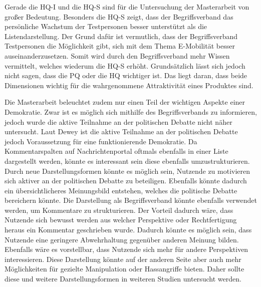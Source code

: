 Gerade die \ac{HQ-I} und die \ac{HQ-S} sind für die Untersuchung der Masterarbeit von großer Bedeutung.
Besonders die \ac{HQ-S} zeigt, dass der Begriffsverband das persönliche Wachstum der Testpersonen besser unterstützt als die Listendarstellung.
Der Grund dafür ist vermutlich, dass der Begriffsverband Testpersonen die Möglichkeit gibt, sich mit dem Thema E-Mobilität besser auseinanderzusetzen.
Somit wird durch den Begriffsverband mehr Wissen vermittelt, welches wiederum die \ac{HQ-S} erhöht.
Grundsätzlich lässt sich jedoch nicht sagen, dass die \ac{PQ} oder die \ac{HQ} wichtiger ist.
Das liegt daran, dass beide Dimensionen wichtig für die wahrgenommene Attraktivität eines Produktes sind.

Die Masterarbeit beleuchtet zudem nur einen Teil der wichtigen Aspekte einer Demokratie.
Zwar ist es möglich sich mithilfe des Begriffsverbands zu informieren, jedoch wurde die aktive Teilnahme an der politischen Debatte nicht näher untersucht.
Laut Dewey ist die aktive Teilnahme an der politischen Debatte jedoch Voraussetzung für eine funktionierende Demokratie.
Da Kommentarspalten auf Nachrichtenportal oftmals ebenfalls in einer Liste dargestellt werden, könnte es interessant sein diese ebenfalls umzustrukturieren.
Durch neue Darstellungsformen könnte es möglich sein, Nutzende zu motivieren sich aktiver an der politischen Debatte zu beteiligen.
Ebenfalls könnte dadurch ein übersichtlicheres Meinungsbild entstehen, welches die politische Debatte bereichern könnte.
Die Darstellung als Begriffsverband könnte ebenfalls verwendet werden, um Kommentare zu strukturieren.
Der Vorteil dadurch wäre, dass Nutzende sich bewusst werden aus welcher Perspektive oder Rechtfertigung heraus ein Kommentar geschrieben wurde.
Dadurch könnte es möglich sein, dass Nutzende eine geringere Abwehrhaltung gegenüber anderen Meinung bilden.
Ebenfalls wäre es vorstellbar, dass Nutzende sich mehr für andere Perspektiven interessieren.
Diese Darstellung könnte auf der anderen Seite aber auch mehr Möglichkeiten für gezielte Manipulation oder Hassangriffe bieten.
Daher sollte diese und weitere Darstellungsformen in weiteren Studien untersucht werden.\\

